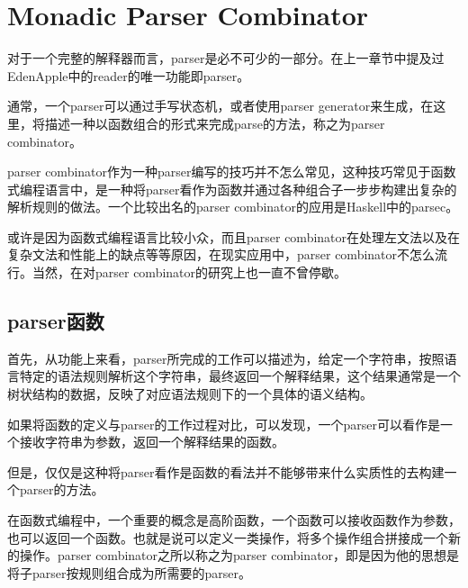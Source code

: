 %
%


\newcommand{\hsbind}[0]{$>\!\!>\!\!=$}
\newcommand{\hschoice}[0]{$<\!\!|\!\!>$}

{
    \let\centering\raggedright
    \chapter{Monadic Parser Combinator}
    \label{ch:parser}
    \thispagestyle{hubu@thesis}
}

对于一个完整的解释器而言，parser是必不可少的一部分。在上一章节中提及过EdenApple中的reader的唯一功能即parser。

通常，一个parser可以通过手写状态机，或者使用parser generator来生成，在这里，将描述一种以函数组合的形式来完成parse的方法，称之为parser combinator。

parser combinator作为一种parser编写的技巧并不怎么常见，这种技巧常见于函数式编程语言中，是一种将parser看作为函数并通过各种组合子一步步构建出复杂的解析规则的做法。一个比较出名的parser combinator的应用是Haskell中的parsec\cite{leijen01parsec}。

或许是因为函数式编程语言比较小众，而且parser combinator在处理左文法以及在复杂文法和性能上的缺点等等原因，在现实应用中，parser combinator不怎么流行。当然，在对parser combinator的研究上也一直不曾停歇。

\section{parser函数}

首先，从功能上来看，parser所完成的工作可以描述为，给定一个字符串，按照语言特定的语法规则解析这个字符串，最终返回一个解释结果，这个结果通常是一个树状结构的数据，反映了对应语法规则下的一个具体的语义结构。

如果将函数的定义与parser的工作过程对比，可以发现，一个parser可以看作是一个接收字符串为参数，返回一个解释结果的函数。

但是，仅仅是这种将parser看作是函数的看法并不能够带来什么实质性的去构建一个parser的方法。

在函数式编程中，一个重要的概念是高阶函数，一个函数可以接收函数作为参数，也可以返回一个函数。也就是说可以定义一类操作，将多个操作组合拼接成一个新的操作。parser combinator之所以称之为parser combinator，即是因为他的思想是将子parser按规则组合成为所需要的parser。

